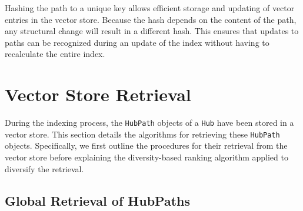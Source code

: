 \begin{tcolorbox}[title=Path Hash: Unique Vector Key]
Hashing the path to a unique key allows efficient storage and updating of vector entries in the vector store. Because the hash depends on the content of the path, any structural change will result in a different hash. This ensures that updates to paths can be recognized during an update of the index without having to recalculate the entire index.
\end{tcolorbox}


\section{Vector Store Retrieval}
\label{sec:hublink_vector_store_operations}

During the indexing process, the \texttt{HubPath} objects of a \texttt{Hub} have been stored in a vector store. This section details the algorithms for retrieving these \texttt{HubPath} objects. Specifically, we first outline the procedures for their retrieval from the vector store before explaining the diversity-based ranking algorithm applied to diversify the retrieval.

\subsection{Global Retrieval of HubPaths}

